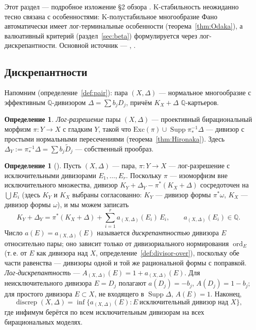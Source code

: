 \documentclass[11pt,a4paper]{article}
\theoremstyle{plain}
\theoremstyle{definition}
\newtheorem{definition}[theorem]{Определение}
\theoremstyle{remark}
\newcommand{\Q}{\mathbb{Q}}
\DeclareMathOperator{\ord}{ord}
\DeclareMathOperator{\discrep}{discrep}
\DeclareMathOperator{\Supp}{Supp}
\begin{document}
Этот раздел --- подробное изложение \S2 обзора \cite{DeV}. K-стабильность неожиданно тесно
связана с особенностями: K-полустабильное многообразие Фано автоматически имеет лог-терминальные
особенности (теорема~\ref{thm:Odaka}), а валюативный критерий (раздел~\ref{sec:beta}) формулируется
через лог-дискрепантности. Основной источник --- \cite[\S\,2.3]{KM}, \cite{KolSing}.

\subsection{Дискрепантности}

Напомним (определение~\ref{def:pair}): пара $(X,\Delta)$ --- нормальное многообразие с эффективным
$\Q$-дивизором $\Delta=\sum b_jD_j$, причём $K_X+\Delta$ $\Q$-картьеров.

\begin{definition}\label{def:logres}
\emph{Лог-разрешение} пары $(X,\Delta)$ --- проективный бирациональный морфизм
$\pi\colon Y\to X$ с гладким $Y$, такой что $\mathrm{Exc}(\pi)\cup\Supp\pi^{-1}_*\Delta$ ---
дивизор с простыми нормальными пересечениями (теорема~\ref{thm:Hironaka}). Здесь
$\Delta_Y:=\pi^{-1}_*\Delta=\sum b_j\tilde D_j$ --- собственный прообраз.
\end{definition}

\begin{definition}[{\cite[2.25--2.28]{KM}}]\label{def:discrep}
Пусть $(X,\Delta)$ --- пара, $\pi\colon Y\to X$ --- лог-разрешение с исключительными дивизорами
$E_1,\dots,E_r$. Поскольку $\pi$ --- изоморфизм вне исключительного множества, дивизор
$K_Y+\Delta_Y-\pi^*(K_X+\Delta)$ сосредоточен на $\bigcup E_i$ (здесь $K_Y$ и $K_X$ выбраны
согласованно: $K_Y$ --- дивизор формы $\pi^*\omega$, $K_X$ --- дивизор формы $\omega$), и мы можем
записать
\[
K_Y+\Delta_Y=\pi^*(K_X+\Delta)+\sum_{i=1}^ra_{(X,\Delta)}(E_i)\,E_i,\qquad a_{(X,\Delta)}(E_i)\in\Q .
\]
Число $a(E)=a_{(X,\Delta)}(E)$ называется \emph{дискрепантностью} дивизора $E$ относительно
пары; оно зависит только от дивизориального нормирования $\ord_E$ (т.\,е. от $E$ как дивизора над
$X$, определение~\ref{def:divisor-over}), поскольку обе части равенства --- дивизоры одной и той же
рациональной формы с поправкой. \emph{Лог-дискрепантность} --- $A_{(X,\Delta)}(E)=1+a_{(X,\Delta)}(E)$.
Для неисключительного дивизора $E=D_j$ полагают $a(D_j)=-b_j$, $A(D_j)=1-b_j$; для простого
дивизора $E\subset X$, не входящего в $\Supp\Delta$, $A(E)=1$. Наконец,
\[
\discrep(X,\Delta)=\inf\{a_{(X,\Delta)}(E):E\ \text{исключительный дивизор над }X\},
\]
где инфимум берётся по всем исключительным дивизорам на всех бирациональных моделях.
\end{definition}
\end{document}
